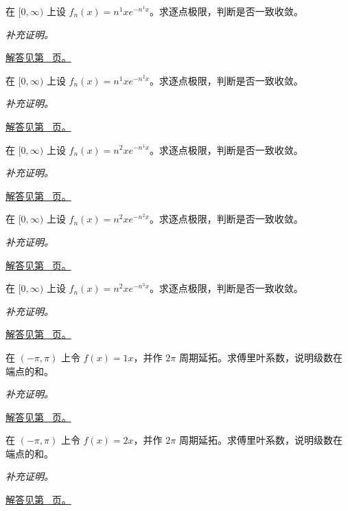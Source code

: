 \documentclass[12pt,fontset=fandol]{ctexart}
\begin{document}
\begin{example}[移动峰值的函数列]\label{ex:c28q8}
在 $[0,\infty)$ 上设 $f_n(x)=n^{1}x e^{-n^{1}x}$。求逐点极限，判断是否一致收敛。
\par\textit{补充证明。}\par\hyperref[ans:c28q8]{解答见第~\pageref{ans:c28q8} 页。}
\end{example}
\begin{example}[移动峰值的函数列]\label{ex:c28q9}
在 $[0,\infty)$ 上设 $f_n(x)=n^{1}x e^{-n^{2}x}$。求逐点极限，判断是否一致收敛。
\par\textit{补充证明。}\par\hyperref[ans:c28q9]{解答见第~\pageref{ans:c28q9} 页。}
\end{example}
\begin{example}[移动峰值的函数列]\label{ex:c28q10}
在 $[0,\infty)$ 上设 $f_n(x)=n^{2}x e^{-n^{1}x}$。求逐点极限，判断是否一致收敛。
\par\textit{补充证明。}\par\hyperref[ans:c28q10]{解答见第~\pageref{ans:c28q10} 页。}
\end{example}
\begin{example}[移动峰值的函数列]\label{ex:c28q11}
在 $[0,\infty)$ 上设 $f_n(x)=n^{2}x e^{-n^{2}x}$。求逐点极限，判断是否一致收敛。
\par\textit{补充证明。}\par\hyperref[ans:c28q11]{解答见第~\pageref{ans:c28q11} 页。}
\end{example}
\begin{example}[移动峰值的函数列]\label{ex:c28q12}
在 $[0,\infty)$ 上设 $f_n(x)=n^{2}x e^{-n^{3}x}$。求逐点极限，判断是否一致收敛。
\par\textit{补充证明。}\par\hyperref[ans:c28q12]{解答见第~\pageref{ans:c28q12} 页。}
\end{example}
\begin{example}[锯齿函数的傅里叶系数]\label{ex:c28q13}
在 $(-\pi,\pi)$ 上令 $f(x)=1x$，并作 $2\pi$ 周期延拓。求傅里叶系数，说明级数在端点的和。
\par\textit{补充证明。}\par\hyperref[ans:c28q13]{解答见第~\pageref{ans:c28q13} 页。}
\end{example}
\begin{example}[锯齿函数的傅里叶系数]\label{ex:c28q14}
在 $(-\pi,\pi)$ 上令 $f(x)=2x$，并作 $2\pi$ 周期延拓。求傅里叶系数，说明级数在端点的和。
\par\textit{补充证明。}\par\hyperref[ans:c28q14]{解答见第~\pageref{ans:c28q14} 页。}
\end{example}
\end{document}
